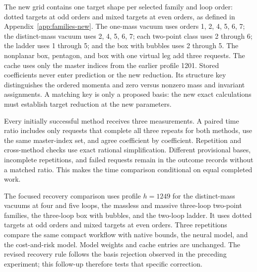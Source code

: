 The new grid contains one target shape per selected family and loop order: dotted targets at odd orders and mixed targets at even orders, as defined in Appendix~\ref{app:families-new}. The one-mass vacuum uses orders 1, 2, 4, 5, 6, 7; the distinct-mass vacuum uses 2, 4, 5, 6, 7; each two-point class uses 2 through 6; the ladder uses 1 through 5; and the box with bubbles uses 2 through 5. The nonplanar box, pentagon, and box with one virtual leg add three requests. The cache uses only the master indices from the earlier profile 1201. Stored coefficients never enter prediction or the new reduction. Its structure key distinguishes the ordered momenta and zero versus nonzero mass and invariant assignments. A matching key is only a proposed basis: the new exact calculations must establish target reduction at the new parameters.

Every initially successful method receives three measurements. A paired time ratio includes only requests that complete all three repeats for both methods, use the same master-index set, and agree coefficient by coefficient. Repetition and cross-method checks use exact rational simplification. Different provisional bases, incomplete repetitions, and failed requests remain in the outcome records without a matched ratio. This makes the time comparison conditional on equal completed work.

The focused recovery comparison uses profile $h=1249$ for the distinct-mass vacuums at four and five loops, the massless and massive three-loop two-point families, the three-loop box with bubbles, and the two-loop ladder. It uses dotted targets at odd orders and mixed targets at even orders. Three repetitions compare the same compact workflow with native bounds, the neural model, and the cost-and-risk model. Model weights and cache entries are unchanged. The revised recovery rule follows the basis rejection observed in the preceding experiment; this follow-up therefore tests that specific correction.
